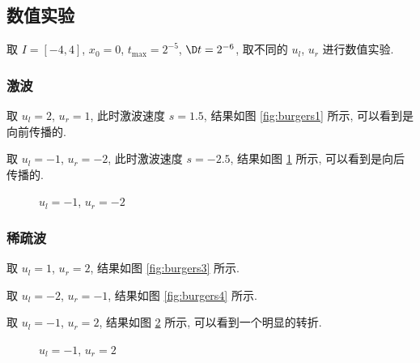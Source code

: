 \documentclass[UTF8, a4paper, 12pt, oneside, onecolumn]{article}
\begin{document}
\subsection{数值实验}

取 $I = [-4, 4]$, $x_0 = 0$, $t_{\max } = 2^{-5}$, $\D t = 2^{-6}$, 取不同的 $u_l$, $u_r$ 进行数值实验.

\subsubsection{激波}

取 $u_l = 2$, $u_r = 1$, 此时激波速度 $s = 1.5$, 结果如图 \ref{fig:burgers1} 所示, 可以看到是向前传播的.

取 $u_l = -1$, $u_r = -2$, 此时激波速度 $s = -2.5$, 结果如图 \ref{fig:burgers2} 所示, 可以看到是向后传播的.

\begin{figure}[H]\centering{}
	\begin{minipage}[t]{.48\linewidth}
		\resizebox{0.99\linewidth}{!}{}
		\caption{$u_l = 2$, $u_r = 1$}\label{fig:burgers1}
	\end{minipage}
	\begin{minipage}[t]{.48\linewidth}
		\resizebox{0.99\linewidth}{!}{}
		\caption{$u_l = -1$, $u_r = -2$}\label{fig:burgers2}
	\end{minipage}
\end{figure}

\subsubsection{稀疏波}

取 $u_l = 1$, $u_r = 2$, 结果如图 \ref{fig:burgers3} 所示.

取 $u_l = -2$, $u_r = -1$, 结果如图 \ref{fig:burgers4} 所示.

取 $u_l = -1$, $u_r = 2$, 结果如图 \ref{fig:burgers5} 所示, 可以看到一个明显的转折.

\begin{figure}[H]\centering{}
	\begin{minipage}[t]{.32\linewidth}
		\resizebox{0.99\linewidth}{!}{}
		\caption{$u_l = 1$, $u_r = 2$}\label{fig:burgers3}
	\end{minipage}
	\begin{minipage}[t]{.32\linewidth}
		\resizebox{0.99\linewidth}{!}{}
		\caption{$u_l = -2$, $u_r = -1$}\label{fig:burgers4}
	\end{minipage}
	\begin{minipage}[t]{.32\linewidth}
		\resizebox{0.99\linewidth}{!}{}
		\caption{$u_l = -1$, $u_r = 2$}\label{fig:burgers5}
	\end{minipage}
\end{figure}
\end{document}
